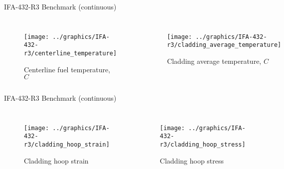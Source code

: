 \documentclass[11pt]{beamer}
\begin{document}
\begin{frame}{IFA-432-R3 Benchmark (continuous)}
  \footnotesize 
  
  \begin{columns}[t]


  \begin{figure}[h]
    \texttt{[image: ../graphics/IFA-432-r3/centerline\_temperature]}
    \caption{Centerline fuel temperature, $C$}
  \end{figure}  


  \begin{figure}[h]
    \texttt{[image: ../graphics/IFA-432-r3/cladding\_average\_temperature]}    
    \caption{Cladding average temperature, $C$}
  \end{figure}  
  
  \end{columns}

\end{frame}

\begin{frame}{IFA-432-R3 Benchmark (continuous)}
  \footnotesize 
  
  \begin{columns}[t]


  \begin{figure}[h]
    \texttt{[image: ../graphics/IFA-432-r3/cladding\_hoop\_strain]}
    \caption{Cladding hoop strain}
  \end{figure}  


  \begin{figure}[h]
    \texttt{[image: ../graphics/IFA-432-r3/cladding\_hoop\_stress]}    
    \caption{Cladding hoop stress}
  \end{figure}  
  
  \end{columns}

\end{frame}
\end{document}
